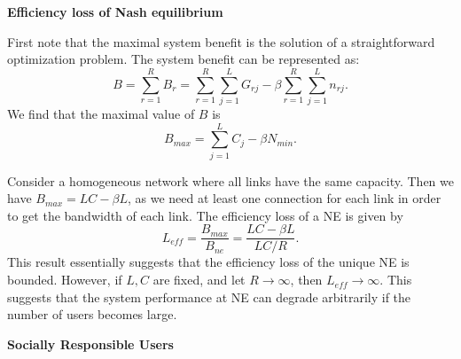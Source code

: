 \documentclass[conference]{IEEEtran}
\begin{document}





\bigskip
\noindent \textbf{Efficiency loss of Nash equilibrium}


First note that the maximal system benefit is the solution of a
straightforward optimization problem. The system benefit can be
represented as:
\begin{equation}
B = \sum_{r=1}^R B_r = \sum_{r=1}^R \sum_{j=1}^L G_{rj} -
  \beta \sum_{r=1}^R  \sum_{j=1}^L n_{rj}. \label{eqn:B.pa}
\end{equation}
We find that the maximal value of $B$
is
\begin{equation}
B_{max} = \sum_{j=1}^L C_j - \beta N_{min}. \label{eqn:B.pa.1}
\end{equation}

Consider a homogeneous network where all links have the same
capacity. Then we have $B_{max}= L C - \beta L$, as we need at
least one connection for each link in order to get the bandwidth
of each link. The efficiency loss of a NE is given by
\begin{equation}
L_{eff}= \frac{B_{max}}{B_{ne}}= \frac{L C-\beta L}{LC/R}.
\end{equation}
This result essentially suggests that the efficiency loss of the
unique NE is bounded.
However, if $L,C$ are fixed, and let $R\to \infty$, then $L_{eff}
\to \infty$. This suggests that the system performance at NE can
degrade arbitrarily if the number of users becomes large.

\bigskip
\noindent \textbf{Socially Responsible Users}
\end{document}
